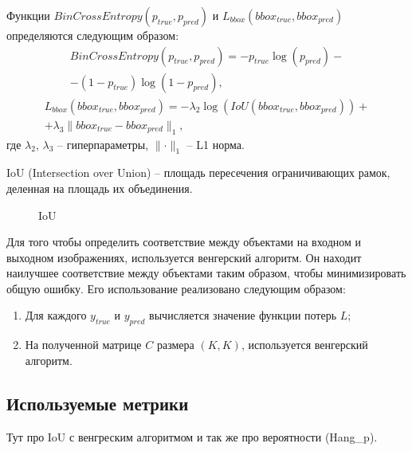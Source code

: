 \documentclass[14pt,a4paper]{extarticle}
\begin{document}
Функции $BinCrossEntropy\left(p_{true}, p_{pred}\right)$ и $L_{bbox} \left(bbox_{true}, bbox_{pred}\right)$ определяются следующим образом:
\begin{multline}
BinCrossEntropy\left(p_{true}, p_{pred}\right) = - p_{true} \log(p_{pred}) -\\ - ( 1 - p_{true} ) \log(1 - p_{pred}),
\end{multline}
\begin{multline}
L_{bbox} \left(bbox_{true}, bbox_{pred}\right) = - \lambda_2 \log(IoU\left(bbox_{true}, bbox_{pred}\right)) +\\ + \lambda_3 \parallel bbox_{true} - bbox_{pred}\parallel_1,
\end{multline}
где $\lambda_2$, $\lambda_3$ -- гиперпараметры, $\parallel \cdot \parallel_1$ -- L1 норма.

IoU (Intersection over Union) -- площадь пересечения ограничивающих рамок, деленная на площадь их объединения.
\begin{figure}[h]
\caption{IoU}
\label{IoU}
\end{figure}  


Для того чтобы определить соответствие между объектами на входном и выходном изображениях, используется венгерский алгоритм. Он находит наилучшее соответствие между объектами таким образом, чтобы минимизировать общую ошибку.
Его использование реализовано следующим образом:
\begin{enumerate}
\item Для каждого $y_{true}$ и $y_{pred}$ вычисляется значение функции потерь $L$;
\item На полученной матрице $C$ размера $(K,K)$, используется венгерский алгоритм.
\end{enumerate}

\newpage
\subsection{Используемые метрики}
Тут про IoU с венгреским алгоритмом и так же про вероятности (Hang\_p).
\end{document}
